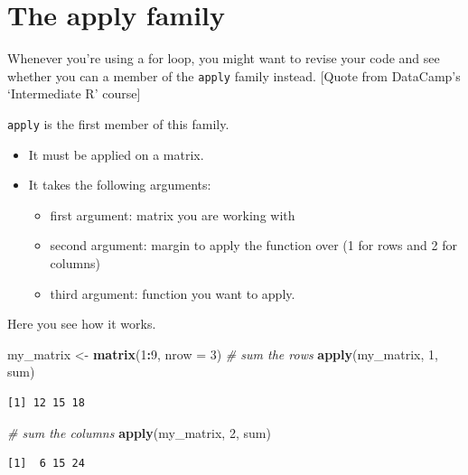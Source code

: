 \documentclass[
]{book}
\newenvironment{Shaded}{\begin{snugshade}}{\end{snugshade}}
\newcommand{\CommentTok}[1]{\textcolor[rgb]{0.56,0.35,0.01}{\textit{#1}}}
\newcommand{\DataTypeTok}[1]{\textcolor[rgb]{0.13,0.29,0.53}{#1}}
\newcommand{\DecValTok}[1]{\textcolor[rgb]{0.00,0.00,0.81}{#1}}
\newcommand{\KeywordTok}[1]{\textcolor[rgb]{0.13,0.29,0.53}{\textbf{#1}}}
\newcommand{\NormalTok}[1]{#1}
\newcommand{\OperatorTok}[1]{\textcolor[rgb]{0.81,0.36,0.00}{\textbf{#1}}}
\newcommand{\StringTok}[1]{\textcolor[rgb]{0.31,0.60,0.02}{#1}}
\providecommand{\tightlist}{%
  \setlength{\itemsep}{0pt}\setlength{\parskip}{0pt}}
\begin{document}
\hypertarget{the-apply-family}{%
\section{The apply family}\label{the-apply-family}}

Whenever you're using a for loop, you might want to revise your code and see whether you can a member of the \texttt{apply} family instead. {[}Quote from DataCamp's `Intermediate R' course{]}

\texttt{apply} is the first member of this family.

\begin{itemize}
\tightlist
\item
  It must be applied on a matrix.
\item
  It takes the following arguments:

  \begin{itemize}
  \tightlist
  \item
    first argument: matrix you are working with
  \item
    second argument: margin to apply the function over (1 for rows and 2
    for columns)
  \item
    third argument: function you want to apply.
  \end{itemize}
\end{itemize}

Here you see how it works.

\begin{Shaded}
\begin{Highlighting}[]
\NormalTok{my_matrix <-}\StringTok{ }\KeywordTok{matrix}\NormalTok{(}\DecValTok{1}\OperatorTok{:}\DecValTok{9}\NormalTok{, }\DataTypeTok{nrow =} \DecValTok{3}\NormalTok{)}
\CommentTok{# sum the rows}
\KeywordTok{apply}\NormalTok{(my_matrix, }\DecValTok{1}\NormalTok{, sum)}
\end{Highlighting}
\end{Shaded}

\begin{verbatim}
[1] 12 15 18
\end{verbatim}

\begin{Shaded}
\begin{Highlighting}[]
\CommentTok{# sum the columns}
\KeywordTok{apply}\NormalTok{(my_matrix, }\DecValTok{2}\NormalTok{, sum)}
\end{Highlighting}
\end{Shaded}

\begin{verbatim}
[1]  6 15 24
\end{verbatim}
\end{document}
